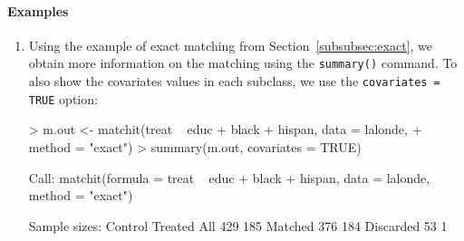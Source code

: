 \documentclass[oneside,letterpaper,titlepage]{article}
\begin{document}
\paragraph{Examples}
\begin{enumerate}
\item Using the example of exact matching from
  Section~\ref{subsubsec:exact}, we obtain more information on the
  matching using the {\tt summary()} command.  To also show the
  covariates values in each subclass, we use the \texttt{covariates =
    TRUE} option:
\begin{Schunk}
\begin{Sinput}
> m.out <- matchit(treat ~ educ + black + hispan, data = lalonde, 
+     method = "exact")
> summary(m.out, covariates = TRUE)
\end{Sinput}
\begin{Soutput}
Call:
matchit(formula = treat ~ educ + black + hispan, data = lalonde, 
    method = "exact")

Sample sizes:
          Control Treated
All           429     185
Matched       376     184
Discarded      53       1


\end{Soutput}
\end{Schunk}
\end{enumerate}
\end{document}
